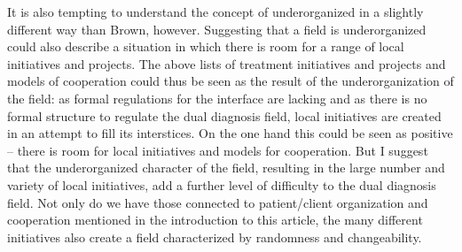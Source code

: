 \begin{multicols}{2}
It is also tempting to understand the concept of underorganized in a slightly different way than Brown, however. Suggesting that a field is underorganized could also describe a situation in which there is room for a range of local initiatives and projects. The above lists of treatment initiatives and projects and models of cooperation could thus be seen as the result of the underorganization of the field: as formal regulations for the interface are lacking and as there is no formal structure to regulate the dual diagnosis field, local initiatives are created in an attempt to fill its interstices. On the one hand this could be seen as positive – there is room for local initiatives and models for cooperation. But I suggest that the underorganized character of the field, resulting in the large number and variety of local initiatives, add a further level of difficulty to the dual diagnosis field. Not only do we have those connected to patient/client organization and cooperation mentioned in the introduction to this article, the many different initiatives also create a field characterized by randomness and changeability.


\end{multicols}
